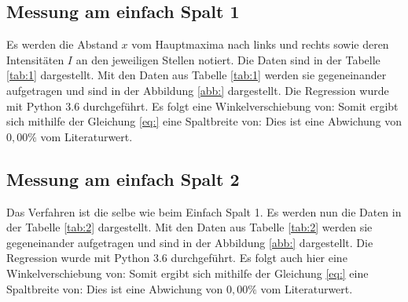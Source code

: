 \subsection{Messung am einfach Spalt 1}
Es werden die Abstand $x$ vom Hauptmaxima nach links und rechts sowie deren Intensitäten $I$
an den jeweiligen Stellen notiert. Die Daten sind in der Tabelle \ref{tab:1} dargestellt.
Mit den Daten aus Tabelle \ref{tab:1} werden sie gegeneinander aufgetragen und sind in der Abbildung
\ref{abb:} dargestellt.
Die Regression wurde mit Python 3.6 durchgeführt.
Es folgt eine Winkelverschiebung von:
Somit ergibt sich mithilfe der Gleichung \ref{eq:} eine Spaltbreite von:
Dies ist eine Abwichung von $0,00\%$ vom Literaturwert.
\subsection{Messung am einfach Spalt 2}
Das Verfahren ist die selbe wie beim Einfach Spalt 1. Es werden nun die Daten
in der Tabelle \ref{tab:2} dargestellt.
Mit den Daten aus Tabelle \ref{tab:2} werden sie gegeneinander aufgetragen und sind in der Abbildung
\ref{abb:} dargestellt.
Die Regression wurde mit Python 3.6 durchgeführt.
Es folgt auch hier eine Winkelverschiebung von:
Somit ergibt sich mithilfe der Gleichung \ref{eq:} eine Spaltbreite von:
Dies ist eine Abwichung von $0,00\%$ vom Literaturwert.
